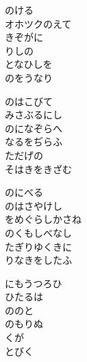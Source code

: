\documentclass[10pt,b5j]{tarticle} %
\begin{document}
\vspace{1.5em} %
\newcommand{\linespace}{0.5em} %
\newcommand{\blocksize}{0.5\hsize} %
\begin{enumerate} %
    \begin{minipage}[c]{\blocksize}
    
        \vspace{\linespace}
        \item
        のける\\
        オホツクのえて\\
        きぞがに\\
        りしの\\
        となひしを\\
        のをうなり
        
        \vspace{\linespace}
        \item
        のはこびて\\
        みさぶるにし\\
        のになぞらへ\\
        なるをぢらふ\\
        ただげの\\
        そはきをきざむ
        
        \vspace{\linespace}
        \item
        のにべる\\
        のはさやけし\\
        をめぐらしかさね\\
        のくもしべなし\\
        たぎりゆくきに\\
        りなきをしたふ
        
        \vspace{\linespace}
        \item
        にもうつろひ\\
        ひたるは\\
        ののと\\
        のもりぬ\\
        くが\\
        とびく
        

\end{minipage}
\end{enumerate}
\end{document}
